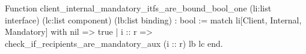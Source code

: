 Function client_internal_mandatory_itfs_are_bound_bool_one 
  (li:list interface) (lc:list component) (lb:list binding) : bool := 
  match li[Client, Internal, Mandatory] with
    nil    => true
  | i :: r => check_if_recipients_are_mandatory_aux (i :: r) lb lc
  end.